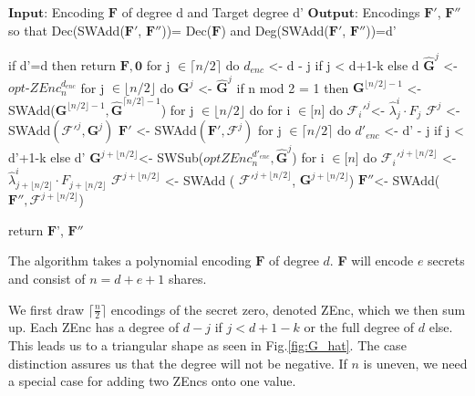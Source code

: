\documentclass[english, version-2020-11]{uzl-thesis}
\begin{document}
 \begin{Pseudocode}[caption={SplitRed for $n=d+e+1$ and $k\leq \lfloor \frac{d}{2} \rfloor$ as shown in \cite{eVer2026}}, label={alg:splitred}]
    $\mathbf{Input}$: Encoding $\mathbf{F}$ of degree d and Target degree d'
  $\mathbf{Output}$: Encodings $\mathbf{F'}$, $\mathbf{F''}$ so that Dec(SWAdd($\mathbf{F'}$, $\mathbf{F''}$))= Dec($\mathbf{F}$) 
    and Deg(SWAdd($\mathbf{F'}$, $\mathbf{F''}$))=d'

    if d'=d then 
      return $\mathbf{F},\mathbf{0}$
    for j $\in \lceil n/2 \rceil$ do
      $ d_{enc}$ <- d - j if j < d+1-k else d
      $\hat{\mathbf{G}}^j$ <- $opt\mbox{-}ZEnc^{d_{enc}}_n$
    for j $\in \lfloor n/2 \rfloor$ do
      $ \mathbf{G}^j$ <- $\hat{ \mathbf{G}}^j$
    if n mod 2 = 1 then 
      $ \mathbf{G}^{\lfloor n/2 \rfloor -1}$ <- SWAdd($ \mathbf{G}^{\lfloor n/2 \rfloor -1},\hat{ \mathbf{G}}^{\lceil n/2 \rceil -1}$)
    for j $\in \lfloor n/2 \rfloor$ do
      for i $\in \lbrack n \rbrack$ do
        $\mathcal{F}_i'^j$<- $\hat{\lambda}^i_j \cdot F_j$
      $\mathcal{F}^j$ <- SWAdd$(\mathcal{F}'^j, \mathbf{G}^j)$
      $\mathbf{F}'$ <- SWAdd$(\mathbf{F}', \mathcal{F}^j)$
    for j $\in \lceil n/2 \rceil$ do
      $ d'_{enc}$ <- d' - j if j < d'+1-k else d'
      $\mathbf{G}^{j+\lfloor n/2 \rfloor}$<- SWSub($optZEnc_n^{d'_{enc}}, \hat{\mathbf{G}}^j$)
      for i $\in \lbrack n \rbrack$ do 
        $\mathcal{F}_i'^{j+\lfloor n/2 \rfloor}$ <- $\hat{\lambda}^i_{j+ \lfloor n/2 \rfloor} \cdot F_{j+ \lfloor n/2 \rfloor}$
      $\mathcal{F}^{j+\lfloor n/2 \rfloor}$ <- SWAdd ( $\mathcal{F}'^{j+\lfloor n/2 \rfloor}$, $\mathbf{G}^{j+\lfloor n/2 \rfloor}$)
      $\mathbf{F}'' $<- SWAdd($\mathbf{F}'', \mathcal{F}^{j+\lfloor n/2 \rfloor}$)
    
    return $\mathbf{F}$', $\mathbf{F}''$
    \end{Pseudocode}
   

    The algorithm takes a polynomial encoding $\mathbf{F}$ of degree $d$. \textbf{F} will encode $e$ secrets and consist of $n=d+e+1$ shares.
     
    We first draw $\lceil\frac{n}{2}\rceil$ encodings of the secret zero, denoted ZEnc, which we then sum up. Each ZEnc has a degree of $d-j$ if $j<d+1-k$ or the full degree of $d$ else. This leads us to a triangular shape as seen in Fig.\ref{fig:G_hat}. The case distinction assures us that the degree will not be negative.
    If $n$ is uneven, we need a special case for adding two ZEncs onto one value. 
\end{document}
